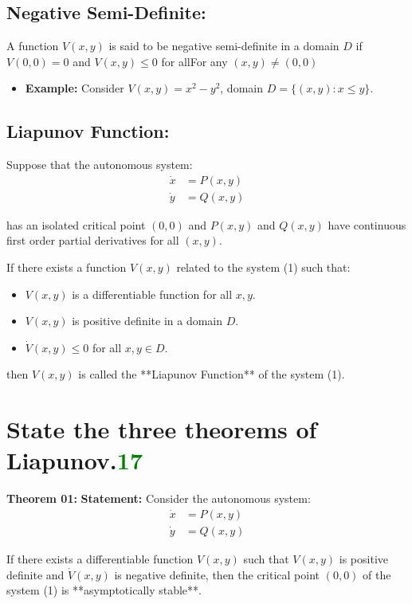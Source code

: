 \subsection*{Negative Semi-Definite:}
A function $V(x, y)$ is said to be negative semi-definite in a domain $D$ if $V(0,0) = 0$ and $V(x, y) \le 0$ for allFor any $(x, y) \neq (0, 0)$
\begin{itemize}
    \item \textbf{Example:} Consider $V(x, y) = x^2 - y^2$, domain $D = \{(x, y) : x \le y\}$.
\end{itemize}
\subsection*{Liapunov Function:}

Suppose that the autonomous system:
\begin{align*}
    \dot{x} &= P(x, y) \nonumber \\
    \dot{y} &= Q(x, y)
\end{align*}

has an isolated critical point $(0,0)$ and $P(x, y)$ and $Q(x, y)$ have continuous first order partial derivatives for all $(x, y)$.

If there exists a function $V(x, y)$ related to the system (1) such that:
\begin{itemize}
    \item $V(x, y)$ is a differentiable function for all $x, y$.
    \item $V(x, y)$ is positive definite in a domain $D$.
    \item $\dot{V}(x, y) \le 0$ for all $x, y \in D$.
\end{itemize}

then $V(x, y)$ is called the **Liapunov Function** of the system (1).

\section{ State the three theorems of Liapunov.\textcolor{green}{17}}
\textbf{Theorem 01:}
\textbf{Statement:}
Consider the autonomous system:
\begin{align}
    \dot{x} &= P(x, y) \nonumber \\
    \dot{y} &= Q(x, y)
\end{align}

If there exists a differentiable function $V(x, y)$ such that $V(x, y)$ is positive definite and $\dot{V}(x, y)$ is negative definite, then the critical point $(0,0)$ of the system (1) is **asymptotically stable**.

